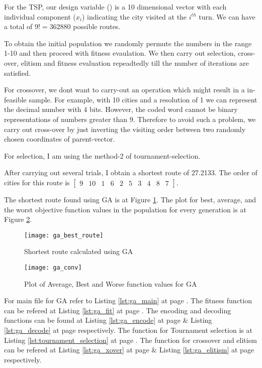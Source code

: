 \documentclass[11pt]{article}
\newcommand{\V}[1]{\pmb{#1}}
\newcommand{\mat}[1]{\begin{bmatrix}#1\end{bmatrix}}
\newcommand{\reflst}[1]{Listing \ref{#1} at page \pageref{#1}}
\newcommand{\reffig}[1]{Figure \ref{#1}}
\begin{document}
\noindent For the TSP, our design variable (\V{x}) is a 10 dimensional vector with each individual component ($x_i$) indicating the city visited at the $i^{th}$ turn. We can have a total of $9!=362880$ possible routes. 

\noindent To obtain the initial population we randomly permute the numbers in the range 1-10 and then proceed with fitness evaulation. We then carry out selection, cross-over, elitism and fitness evaluation repeadtedly till the number of iterations are satisfied. 

\noindent For crossover, we dont want to carry-out an operation which might result in a in-feasible sample. For example, with 10 cities and a resolution of 1 we can represent the decimal number with 4 bits. However, the coded word cannot be binary representations of numbers greater than 9. Therefore to avoid such a problem, we carry out cross-over by just inverting the visiting order between two randomly chosen coordinates of parent-vector.

\noindent For selection, I am using the method-2 of tournament-selection.

\noindent After carrying out several trials, I obtain a shortest route of 27.2133. The order of cities for this route is $\mat{ 9   & 10&     1&     6&     2&     5&     3&     4&     8&     7}$. 

\noindent The shortest route found using GA is at \reffig{fig:ga_route}. The plot for best, average, and the worst objective function values in the population for every generation is at \reffig{fig:ga_conv}.

\begin{figure}[!h]
  \centering
 \texttt{[image: ga\_best\_route]}
 \caption{Shortest route calculated using GA}
 \label{fig:ga_route}
\end{figure}

\begin{figure}[!h]
 \centering
 \texttt{[image: ga\_conv]}
 \caption{Plot of Average, Best and Worse function values for GA}
 \label{fig:ga_conv}
\end{figure}
\noindent For main file for GA refer to \reflst{lst:ga_main}. The fitness function can be refered at \reflst{lst:ga_fit}. The encoding and decoding functions can be found at \reflst{lst:ga_encode}\& \reflst{lst:ga_decode} respectively. The function for Tournament selection is at \reflst{lst:tournament_selection}. The function for crossover and elitism can be refered at \reflst{lst:ga_xover} \& \reflst{lst:ga_elitism} respectively.
\end{document}

